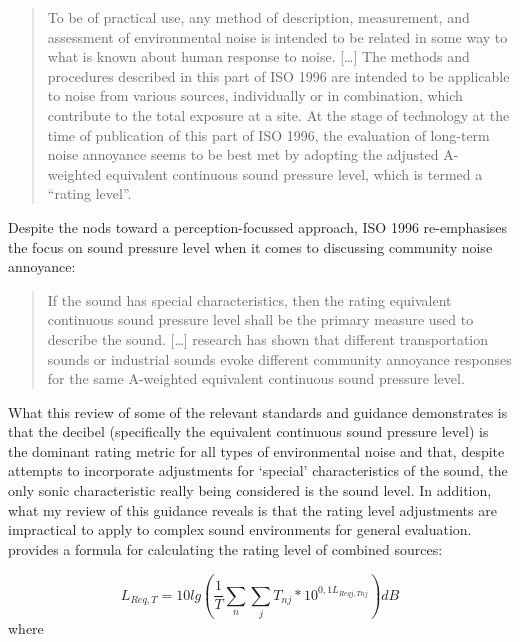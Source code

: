 \begin{quote}
  To be of practical use, any method of description, measurement, and assessment of environmental noise is intended to be related in some way to what is known about human response to noise. [\ldots] The methods and procedures described in this part of ISO 1996 are intended to be applicable to noise from various sources, individually or in combination, which contribute to the total exposure at a site. At the stage of technology at the time of publication of this part of ISO 1996, the evaluation of long-term noise annoyance seems to be best met by adopting the adjusted A-weighted equivalent continuous sound pressure level, which is termed a ``rating level''. 
        \begin{flushright}
    \citet{ISO1996Part1}
  \end{flushright}
\end{quote}

Despite the nods toward a perception-focussed approach, ISO 1996 re-emphasises the focus on sound pressure level when it comes to discussing community noise annoyance:

\begin{quote}
  If the sound has special characteristics, then the rating equivalent continuous sound pressure level shall be the primary measure used to describe the sound. [\dots] research has shown that different transportation sounds or industrial sounds evoke different community annoyance responses for the same A-weighted equivalent continuous sound pressure level.
        \begin{flushright}
    \citet[Sec. 6.1]{ISO1996Part1}
  \end{flushright}
\end{quote}

What this review of some of the relevant standards and guidance demonstrates is that the decibel (specifically the equivalent continuous sound pressure level) is the dominant rating metric for all types of environmental noise and that, despite attempts to incorporate adjustments for `special' characteristics of the sound, the only sonic characteristic really being considered is the sound level. In addition, what my review of this guidance reveals is that the rating level adjustments are impractical to apply to complex sound environments for general evaluation. \citet[Eq. 4]{ISO1996Part1} provides a formula for calculating the rating level of combined sources:

\begin{equation}
L_{Req,T} = 10lg \left(\frac{1}{T} \sum_n \sum_j T_{nj} * 10^{0,1L_{Reqj,Tnj}}  \right) dB
\label{eqn:iso1996Rating}
\end{equation}
where

